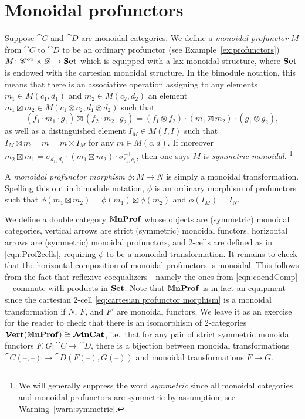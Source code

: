 \documentclass[11pt,oneside,article]{memoir}
\begin{document}
\section{Monoidal profunctors}
  \label{sec:monoidal_profunctors}

Suppose $\cat{C}$ and $\cat{D}$ are monoidal categories. We define a \emph{monoidal profunctor} $M$
from $\cat{C}$ to $\cat{D}$ to be an ordinary profunctor (see Example~\ref{ex:profunctors}) $M\colon
{\mathscr{C}}^{\text{op}}\times\mathscr{D}\to\mathbf{Set}$ which is equipped with a lax-monoidal structure, where $\mathbf{Set}$ is
endowed with the cartesian monoidal structure. In the bimodule notation, this means that there is an
associative operation assigning to any elements $m_1\in M(c_1,d_1)$ and $m_2\in M(c_2,d_2)$ an
element $m_1\boxtimes m_2\in M(c_1\otimes c_2,d_1\otimes d_2)$ such that
\[
   (f_1\cdot m_1\cdot g_1)\boxtimes(f_2\cdot m_2\cdot g_2)
      = (f_1\otimes f_2)\cdot(m_1\boxtimes m_2)\cdot(g_1\otimes g_2),
\]
as well as a distinguished element $I_M\in M(I,I)$ such that $I_M\boxtimes m = m = m\boxtimes I_M$
for any $m\in M(c,d)$. If moreover $m_2\boxtimes m_1 = \sigma_{d_1,d_2}\cdot(m_1\boxtimes
m_2)\cdot\sigma_{c_1,c_2}^{-1}$, then one says $M$ is \emph{symmetric monoidal}.%
\footnote{
  We will generally suppress the word \emph{symmetric} since all monoidal categories and monoidal
  profunctors are symmetric by assumption; see Warning~\ref{warn:symmetric}.
}

A \emph{monoidal profunctor morphism} $\phi\colon M\to N$ is simply a monoidal transformation.
Spelling this out in bimodule notation, $\phi$ is an ordinary morphism of profunctors such that
$\phi(m_1\boxtimes m_2)=\phi(m_1)\boxtimes\phi(m_2)$ and $\phi(I_M)=I_N$.

We define a double category $\mathbb{M}\mathbf{nProf}$ whose objects are (symmetric) monoidal categories, vertical
arrows are strict (symmetric) monoidal functors, horizontal arrows are (symmetric) monoidal
profunctors, and 2-cells are defined as in \eqref{eqn:Prof2cells}, requiring $\phi$ to be a monoidal
transformation. It remains to check that the horizontal composition of monoidal profunctors is
monoidal. This follows from the fact that reflexive coequalizers---namely the ones from
\eqref{eqn:coendComp}---commute with products in $\mathbf{Set}$. Note that $\mathbb{M}\mathbf{nProf}$ is in fact an
equipment since the cartesian 2-cell \eqref{eq:cartesian profunctor morphism} is a monoidal
transformation if $N$, $F$, and $F'$ are monoidal functors. We leave it as an exercise for the
reader to check that there is an isomorphism of 2-categories $\bm{\mathcal{V}}\mathbf{ert}(\mathbb{M}\mathbf{nProf})\cong\bm{\mathcal{M}}\mathbf{nCat}$, i.e.\
that for any pair of strict symmetric monoidal functors $F,G\colon\cat{C}\to\cat{D}$, there is a
bijection between monoidal transformations
$\cat{C}(\textrm{--},\textrm{--})\to\cat{D}(F(\textrm{--}),G(\textrm{--}))$ and monoidal
transformations $F\to G$.
\end{document}
